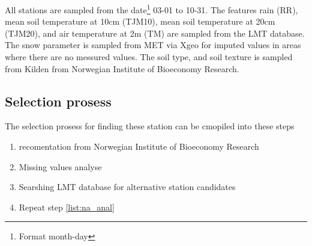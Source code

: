 All stations are sampled from the date\footnote{Format month-day} 03-01 to 10-31. The features rain (RR), mean soil temperature at 10cm (TJM10), mean soil temperature at 20cm (TJM20), and air temperature at 2m (TM) are sampled from the LMT database. The snow parameter is sampled from MET via Xgeo for imputed values in areas where there are no messured values. The soil type, and soil texture is sampled from Kilden from Norwegian Institute of Bioeconomy Research.

\subsection{Selection prosess}
The selection prosess for finding these station can be cmopiled into these steps
\begin{enumerate}
	\item recomentation from Norwegian Institute of Bioeconomy Research
	\item \label{list:na_anal}Missing values analyse 
	\item Searshing LMT database for alternative station candidates
	\item Repeat step \ref{list:na_anal}
\end{enumerate}